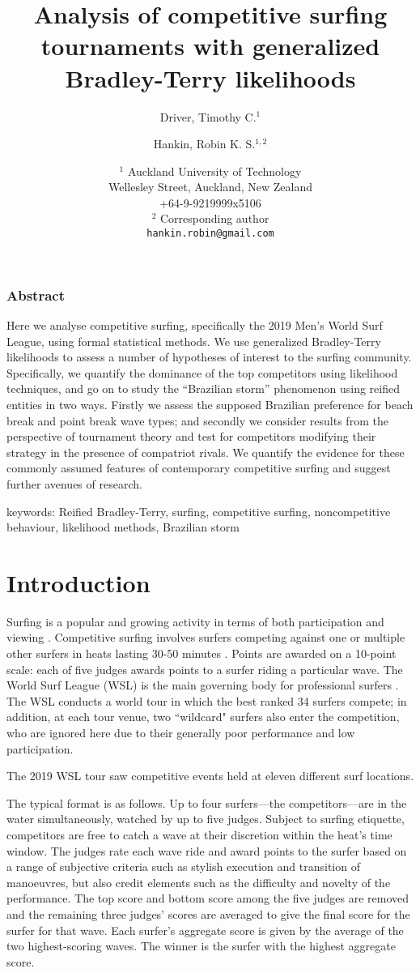 \documentclass{article}
\author{Driver, Timothy C.${}^{1}$ \and
    Hankin, Robin K. S.${}^{1,2}$}
\date{${}^{1}$ Auckland University of Technology\\
    Wellesley Street, Auckland, New Zealand\\
    +64-9-9219999x5106\\
    ${}^2$ Corresponding author\\
    \texttt{hankin.robin@gmail.com}
  }
\title{Analysis of competitive surfing tournaments with generalized Bradley-Terry likelihoods}
\begin{document}
\maketitle
  
\subsubsection*{Abstract}
Here we analyse competitive surfing, specifically the 2019 Men's World Surf
League, using formal statistical methods.  We use generalized
Bradley-Terry likelihoods to assess a number of hypotheses of interest
to the surfing community.  Specifically, we quantify the dominance of
the top competitors using likelihood techniques, and go on to study
the ``Brazilian storm'' phenomenon using reified entities in two ways.
Firstly we assess the supposed Brazilian preference for beach break
and point break wave types; and secondly we consider results from the
perspective of tournament theory and test for competitors modifying
their strategy in the presence of compatriot rivals.  We quantify the
evidence for these commonly assumed features of contemporary
competitive surfing and suggest further avenues of research.

keywords: Reified Bradley-Terry, surfing, competitive surfing, noncompetitive behaviour, likelihood methods, Brazilian storm
\newpage

\section{Introduction}

Surfing is a popular and growing activity in terms of both
participation and viewing \citep{warshaw2010}.  Competitive surfing
involves surfers competing against one or multiple other surfers in heats
lasting 30-50 minutes \citep{booth1995}.  Points are awarded on a
10-point scale: each of five judges awards points to a surfer riding a
particular wave.  The World Surf League (WSL) is the main governing
body for professional surfers \citep{wsl}.  The WSL conducts a world
tour in which the best ranked 34 surfers compete; in addition, at each
tour venue, two ``wildcard" surfers also enter the competition, who
are ignored here due to their generally poor performance and low
participation.

The 2019 WSL tour saw competitive events held at eleven
different surf locations.

The typical format is as follows.  Up to four surfers---the
competitors---are in the water simultaneously, watched by up to five
judges.  Subject to surfing etiquette, competitors are free to catch a
wave at their discretion within the heat's time window.  The judges
rate each wave ride and award points to the surfer based on a range of
subjective criteria such as stylish execution and transition of
manoeuvres, but also credit elements such as the difficulty and
novelty of the performance.  The top score and bottom score among the
five judges are removed and the remaining three judges' scores are
averaged to give the final score for the surfer for that wave.  Each
surfer's aggregate score is given by the average of the two
highest-scoring waves.  The winner is the surfer with the highest
aggregate score.
\end{document}
